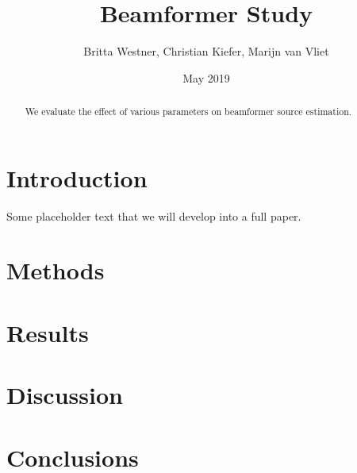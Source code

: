 \documentclass{article}
\title{Beamformer Study}
\author{Britta Westner, Christian Kiefer, Marijn van Vliet}
\date{May 2019}
\begin{document}
\maketitle
\begin{abstract}
    We evaluate the effect of various parameters on beamformer source estimation.
\end{abstract}

\section{Introduction}

Some placeholder text that we will develop into a full paper.

\section{Methods}
\section{Results}
\section{Discussion}
\section{Conclusions}
\end{document}
